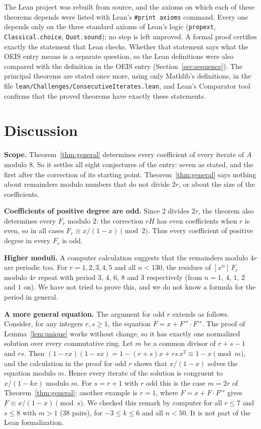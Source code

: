 \documentclass[11pt,a4paper]{article}
\theoremstyle{definition}
\theoremstyle{remark}
\newcommand{\coeff}[2]{[x^{#1}]\,#2}
\newcommand{\para}[1]{\par\medskip\noindent\textbf{#1}\enspace}
\begin{document}
The Lean project was rebuilt from source, and the axioms on which each of these theorems depends were listed with
Lean's \texttt{\#print axioms} command. Every one depends only on the three standard axioms of Lean's logic
(\texttt{propext}, \texttt{Classical.choice}, \texttt{Quot.sound}); no step is left unproved. A formal proof certifies
exactly the statement that Lean checks. Whether that statement says what the OEIS entry means is a separate question,
so the Lean definitions were also compared with the definition in the OEIS entry
(Section~\ref{sec:sequence}). The principal theorems are stated once more, using only Mathlib's definitions, in the
file \texttt{lean/Challenges/ConsecutiveIterates.lean}, and Lean's Comparator tool confirms that the
proved theorems have exactly these statements.

\section{Discussion}\label{sec:discussion}

\para{Scope.} Theorem~\ref{thm:general} determines every coefficient of every iterate of $A$ modulo $8$. So it
settles all eight conjectures of the entry: seven as stated, and the first after the correction of its starting
point. Theorem~\ref{thm:general} says nothing about remainders modulo numbers that do
not divide $2r$, or about the size of the coefficients.

\para{Coefficients of positive degree are odd.} Since $2$ divides $2r$, the theorem also determines every $F_r$ modulo $2$: the
correction $rH$ has even coefficients when $r$ is even, so in all cases $F_r\equiv x/(1-x)\pmod2$. Thus every
coefficient of positive degree in every $F_r$ is odd.

\para{Higher moduli.} A computer calculation suggests that the remainders modulo $4r$ are periodic too. For $r=1,2,3,4,5$
and all $n<130$, the residues of $\coeff{n}{F_r}$ modulo $4r$ repeat with period $3$, $4$, $6$, $8$ and $3$
respectively (from $n=1$, $4$, $1$, $2$ and $1$ on). We have not tried to prove this, and we do not know a formula for
the period in general.

\para{A more general equation.} The argument for odd $r$ extends as follows. Consider, for any integers $r,s\ge1$, the
equation $F=x+F^{\circ r}\cdot F^{\circ s}$. The proof of Lemma~\ref{lem:unique} works without change, so it has exactly
one normalized solution over every commutative ring. Let $m$ be a common divisor of $r+s-1$ and $rs$. Then
$(1-rx)(1-sx)=1-(r+s)x+rs\,x^2\equiv1-x\pmod m$, and the calculation in the proof for odd $r$ shows that
$x/(1-x)$ solves the equation modulo $m$. Hence every iterate of the solution is congruent to $x/(1-kx)$ modulo $m$.
For $s=r+1$ with $r$ odd this is the case $m=2r$ of Theorem~\ref{thm:general}; another example is $r=1$, where
$F=x+F\cdot F^{\circ s}$ gives $F\equiv x/(1-x)\pmod s$. We checked this remark by computer for all $r\le7$ and
$s\le8$ with $m>1$ ($38$ pairs), for $-3\le k\le6$ and all $n<50$. It is not part of the Lean formalization.
\end{document}
